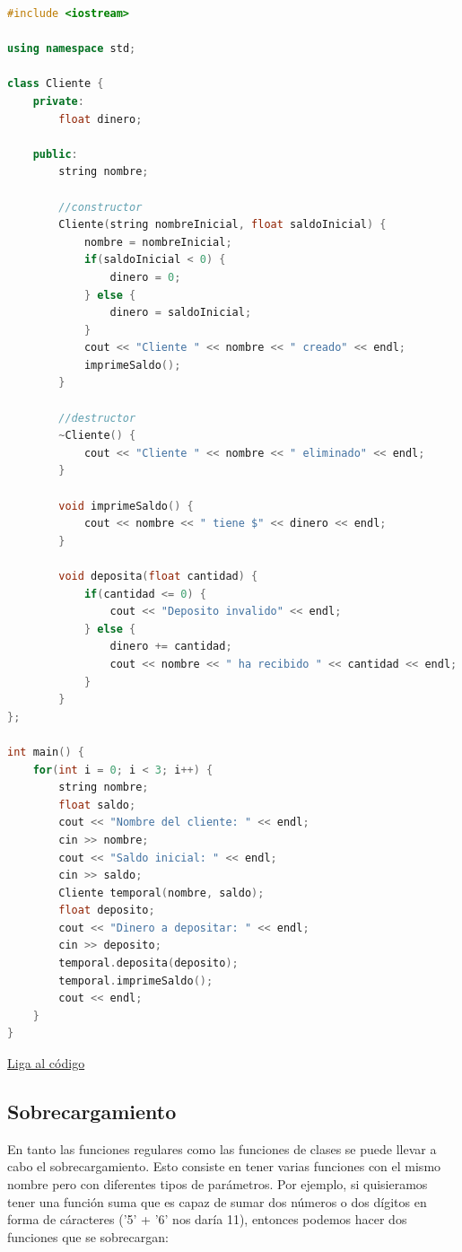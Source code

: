 \documentclass{article}
\begin{document}
\begin{lstlisting}[language=C++, caption=Destructores]
#include <iostream>

using namespace std;

class Cliente {
    private:
        float dinero;

    public:
        string nombre;

        //constructor
        Cliente(string nombreInicial, float saldoInicial) {
            nombre = nombreInicial;
            if(saldoInicial < 0) {
                dinero = 0;
            } else {
                dinero = saldoInicial;
            }
            cout << "Cliente " << nombre << " creado" << endl;
            imprimeSaldo();
        }

        //destructor
        ~Cliente() {
            cout << "Cliente " << nombre << " eliminado" << endl;
        }

        void imprimeSaldo() {
            cout << nombre << " tiene $" << dinero << endl;
        }

        void deposita(float cantidad) {
            if(cantidad <= 0) {
                cout << "Deposito invalido" << endl;
            } else {
                dinero += cantidad;
                cout << nombre << " ha recibido " << cantidad << endl;
            }
        }
};

int main() {
    for(int i = 0; i < 3; i++) {
        string nombre;
        float saldo;
        cout << "Nombre del cliente: " << endl;
        cin >> nombre;
        cout << "Saldo inicial: " << endl;
        cin >> saldo;
        Cliente temporal(nombre, saldo);
        float deposito;
        cout << "Dinero a depositar: " << endl;
        cin >> deposito;
        temporal.deposita(deposito);
        temporal.imprimeSaldo();
        cout << endl;
    }
}
\end{lstlisting}
\href{https://repl.it/@Jamesscn/Clases}{Liga al código} \\

\subsection{Sobrecargamiento}

En tanto las funciones regulares como las funciones de clases se puede llevar a cabo el sobrecargamiento. Esto consiste en tener varias funciones con el mismo nombre pero con diferentes tipos de parámetros. Por ejemplo, si quisieramos tener una función suma que es capaz de sumar dos números o dos dígitos en forma de cáracteres ('5' + '6' nos daría 11), entonces podemos hacer dos funciones que se sobrecargan:
\end{document}
